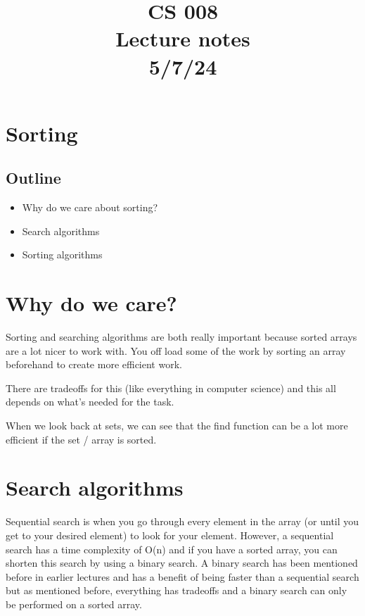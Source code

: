 \documentclass[11pt,a4paper,english]{paper}
\begin{document}
\title{CS 008 \\ Lecture notes \\ 5/7/24}
\maketitle

\section{Sorting}

\subsection{Outline}

\begin{itemize}
  
  \item Why do we care about sorting?
  \item Search algorithms
  \item Sorting algorithms

\end{itemize}

\section{Why do we care?}

Sorting and searching algorithms are both really important because sorted arrays are a lot nicer to work with. You off load some of the work by sorting an array beforehand to create more efficient work. 

There are tradeoffs for this (like everything in computer science) and this all depends on what's needed for the task.

When we look back at sets, we can see that the find function can be a lot more efficient if the set / array is sorted. 


\section{Search algorithms}

Sequential search is when you go through every element in the array (or until you get to your desired element) to look for your element. However, a sequential search has a time complexity of O(n) and if you have a sorted array, you can shorten this search by using a binary search. A binary search has been mentioned before in earlier lectures and has a benefit of being faster than a sequential search but as mentioned before, everything has tradeoffs and a binary search can only be performed on a sorted array.
\end{document}
